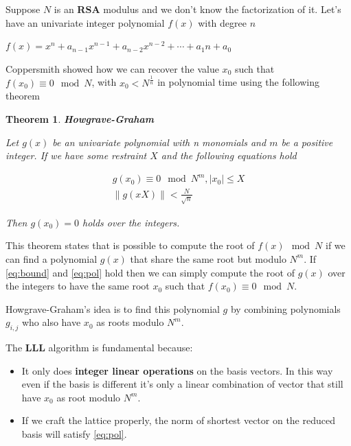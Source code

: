 \documentclass[a4paper,12pt]{report}
\newtheorem{theorem}{Theorem}[section]
\begin{document}
Suppose $N$ is an \textbf{RSA} modulus and we don't know the factorization of it. Let's have an univariate integer polynomial $f(x)$ with degree $n$

\begin{center}
    $f(x) = x^n + a_{n-1}x^{n-1} + a_{n-2}x^{n-2} + \cdots + a_1n + a_0$
\end{center}

Coppersmith showed how we can recover the value $x_0$ such that $f(x_0) \equiv 0 \mod N$, with $x_0 < N^{\frac{1}{n}}$ in polynomial time
using the following theorem

\begin{theorem}
    \textbf{Howgrave-Graham}
\end{theorem}

\textit{Let $g(x)$ be an univariate polynomial with n monomials and $m$ be a positive integer.
    If we have some restraint $X$ and the following equations hold}

\begin{center}
    \begin{eqnarray}
        g(x_0) \equiv 0 \mod N^m, |x_0| \le X \label{eq:bound} \\
         \lVert g(xX) \rVert < \frac{N}{\sqrt{n}} \label{eq:pol}
    \end{eqnarray}
\end{center}

\textit{Then $g(x_0) = 0$ holds over the integers.}

\vspace*{10px}

This theorem states that is possible to compute the root of $f(x) \mod N$ if we can find a polynomial $g(x)$ that share the same root but modulo $N^m$.
If \ref{eq:bound} and \ref{eq:pol} hold then we can simply compute the root of $g(x)$ over the integers to have the same root $x_0$
such that $f(x_0) \equiv 0 \mod N$.

Howgrave-Graham's idea is to find this polynomial $g$ by combining polynomials $g_{i,j}$ who also have $x_0$ as roots modulo $N^m$.

\vspace*{10px}

The \textbf{LLL} algorithm is fundamental because:

\begin{itemize}
    \item It only does \textbf{integer linear operations} on the basis vectors.
        In this way even if the basis is different it's only a linear combination of vector that still have $x_0$ as root
        modulo $N^m$.
    \item If we craft the lattice properly, the norm of shortest vector on the reduced basis will satisfy \ref{eq:pol}.
\end{itemize}
\end{document}

